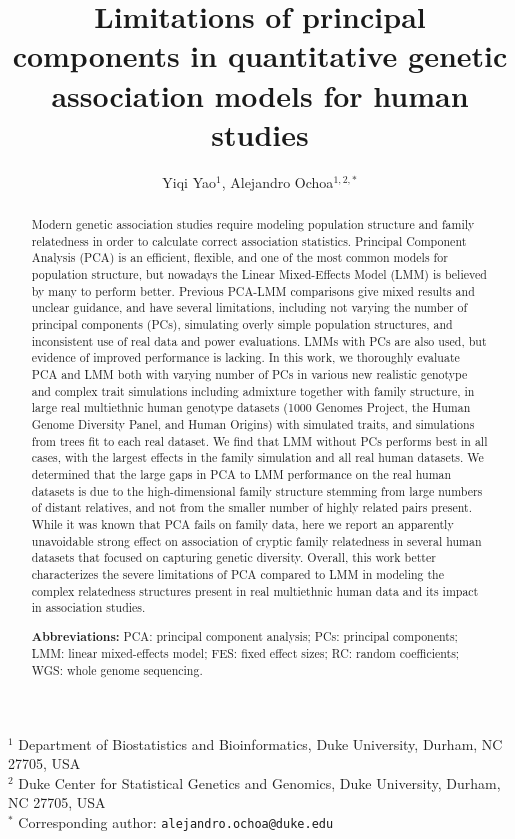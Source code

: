 \documentclass[11pt]{article}
\title{\Large \textbf{
    Limitations of principal components in quantitative genetic association models for human studies
  }}
\author{Yiqi Yao$^1$, Alejandro Ochoa$^{1,2,*}$}
\date{}
\begin{document}
\maketitle

\noindent
$^1$ Department of Biostatistics and Bioinformatics, Duke University, Durham, NC 27705, USA \\
$^2$ Duke Center for Statistical Genetics and Genomics, Duke University, Durham, NC 27705, USA \\
$^*$ Corresponding author: \texttt{alejandro.ochoa@duke.edu}

\begin{abstract}
  Modern genetic association studies require modeling population structure and family relatedness in order to calculate correct association statistics.
  Principal Component Analysis (PCA) is an efficient, flexible, and one of the most common models for population structure, but nowadays the Linear Mixed-Effects Model (LMM) is believed by many to perform better.
  Previous PCA-LMM comparisons give mixed results and unclear guidance, and have several limitations, including not varying the number of principal components (PCs), simulating overly simple population structures, and inconsistent use of real data and power evaluations.
  LMMs with PCs are also used, but evidence of improved performance is lacking.
  In this work, we thoroughly evaluate PCA and LMM both with varying number of PCs in various new realistic genotype and complex trait simulations including admixture together with family structure, in large real multiethnic human genotype datasets (1000 Genomes Project, the Human Genome Diversity Panel, and Human Origins) with simulated traits, and simulations from trees fit to each real dataset.
  We find that LMM without PCs performs best in all cases, with the largest effects in the family simulation and all real human datasets.
  We determined that the large gaps in PCA to LMM performance on the real human datasets is due to the high-dimensional family structure stemming from large numbers of distant relatives, and not from the smaller number of highly related pairs present.
  While it was known that PCA fails on family data, here we report an apparently unavoidable strong effect on association of cryptic family relatedness in several human datasets that focused on capturing genetic diversity.
  Overall, this work better characterizes the severe limitations of PCA compared to LMM in modeling the complex relatedness structures present in real multiethnic human data and its impact in association studies.

  
  \textbf{Abbreviations:}
  PCA: principal component analysis;
  PCs: principal components;
  LMM: linear mixed-effects model;
  FES: fixed effect sizes;
  RC: random coefficients;
  WGS: whole genome sequencing.
\end{abstract}
\end{document}
